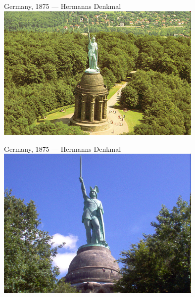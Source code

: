 \begin{frame}{Germany, 1875 --- Hermanns Denkmal}
    \centering
    \includegraphics[width=0.75\textwidth]{img/hermans-denkmal.png} \\
\end{frame}

\begin{frame}{Germany, 1875 --- Hermanns Denkmal}
    \centering
    \includegraphics[width=0.75\textwidth]{img/herman2.png} \\
\end{frame}

